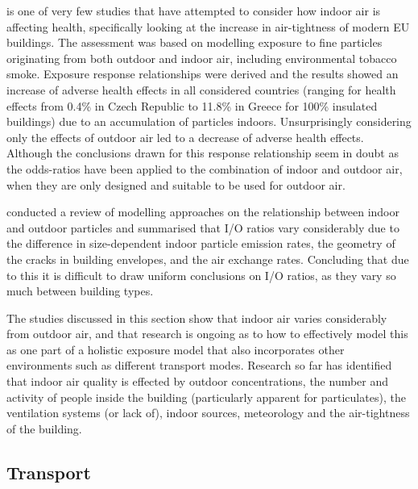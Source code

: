 \cite{Gens2014} is one of very few studies that have attempted to consider how indoor air is affecting health, specifically looking at the increase in air-tightness of modern EU buildings. The assessment was based on modelling exposure to fine particles originating from both outdoor and indoor air, including environmental tobacco smoke. Exposure response relationships were derived and the results showed an increase of adverse health effects in all considered countries (ranging for health effects from 0.4\% in Czech Republic to 11.8\% in Greece for 100\% insulated buildings) due to an accumulation of particles indoors. Unsurprisingly considering only the effects of outdoor air led to a decrease of adverse health effects.  Although the conclusions drawn for this response relationship seem in doubt as the odds-ratios have been applied to the combination of indoor and outdoor air, when they are only designed and suitable to be used for outdoor air.

\cite{Chen2011} conducted a review of modelling approaches on the relationship between indoor and outdoor particles and summarised that I/O ratios vary considerably due to the difference in size-dependent indoor particle emission rates, the geometry of the cracks in building envelopes, and the air exchange rates. Concluding that due to this it is difficult to draw uniform conclusions on I/O ratios, as they vary so much between building types.

The studies discussed in this section show that indoor air varies considerably from outdoor air, and that research is ongoing as to how to effectively model this as one part of a holistic exposure model that also incorporates other environments such as different transport modes. Research so far has identified that indoor air quality is effected by outdoor concentrations, the number and activity of people inside the building (particularly apparent for particulates), the ventilation systems (or lack of), indoor sources, meteorology and the air-tightness of the building.


\subsection{Transport}
\label{sec:transport}

